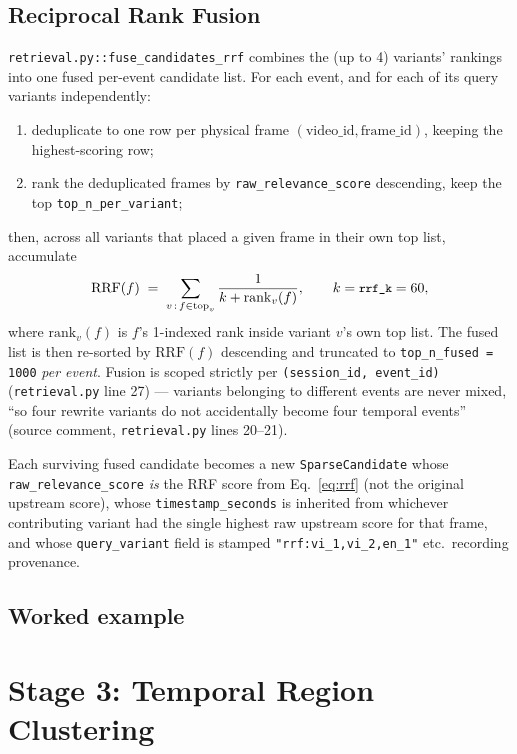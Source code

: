 \documentclass[11pt]{article}
\newcommand{\code}[1]{\texttt{\small #1}}
\newcommand{\file}[1]{\texttt{\footnotesize #1}}
\begin{document}
\subsection{Reciprocal Rank Fusion}
\file{retrieval.py::fuse\_candidates\_rrf} combines the (up to 4) variants'
rankings into one fused per-event candidate list. For each event, and for
each of its query variants independently:
\begin{enumerate}[nosep]
  \item deduplicate to one row per physical frame $(\text{video\_id},
    \text{frame\_id})$, keeping the highest-scoring row;
  \item rank the deduplicated frames by \code{raw\_relevance\_score}
    descending, keep the top \code{top\_n\_per\_variant};
\end{enumerate}
then, across all variants that placed a given frame in their own top list,
accumulate
\begin{equation}
  \mathrm{RRF}(f) \;=\; \sum_{v \,:\, f \in \text{top}_v} \frac{1}{k + \mathrm{rank}_v(f)},
  \qquad k = \code{rrf\_k} = 60,
  \label{eq:rrf}
\end{equation}
where $\mathrm{rank}_v(f)$ is $f$'s 1-indexed rank inside variant $v$'s own
top list. The fused list is then re-sorted by $\mathrm{RRF}(f)$ descending and
truncated to \code{top\_n\_fused = 1000} \emph{per event}. Fusion is scoped
strictly per \code{(session\_id, event\_id)}
(\code{retrieval.py} line 27) --- variants belonging to different events are
never mixed, ``so four rewrite variants do not accidentally become four
temporal events'' (source comment, \file{retrieval.py} lines 20--21).

Each surviving fused candidate becomes a new \code{SparseCandidate} whose
\code{raw\_relevance\_score} \emph{is} the RRF score from
Eq.~\ref{eq:rrf} (not the original upstream score), whose
\code{timestamp\_seconds} is inherited from whichever contributing variant
had the single highest raw upstream score for that frame, and whose
\code{query\_variant} field is stamped \code{"rrf:vi\_1,vi\_2,en\_1"} etc.\
recording provenance.

\subsection{Worked example}


\section{Stage 3: Temporal Region Clustering}
\label{sec:stage3}
\end{document}

